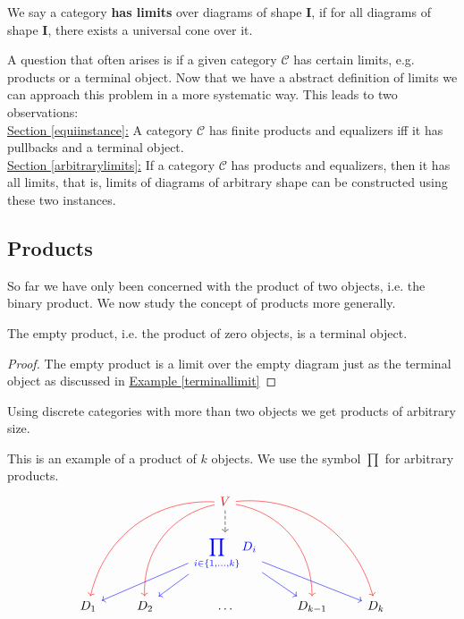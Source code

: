 \begin{definition}
We say a category \textbf{has limits} over diagrams of shape $\bm I$, if for all
diagrams of shape $\bm I$, there exists a universal cone over it.
\end{definition}
A question that often arises is if a given category $\mathscr C$ has certain limits,
e.g. products or a terminal object. Now that we have a abstract definition of limits
we can approach this problem in a more systematic way.
This leads to two observations:\\
\hyperref[equiinstance]{Section \ref*{equiinstance}:} A category $\mathscr C$ has finite products and equalizers iff
it has pullbacks and a terminal
object.\\
\hyperref[arbitrarylimits]{Section \ref*{arbitrarylimits}:}
If a category $\mathscr C$ has products and equalizers, then it has all limits, that is,
limits of diagrams of arbitrary shape can be constructed using these two instances.

\subsection{Products}
So far we have only been concerned with the product of two objects, i.e. the binary product.
We now study the concept of products more generally.
\begin{lemma}
  \label{emptyproduct}
  The empty product, i.e. the product of zero objects, is a terminal object.
\end{lemma}
\begin{proof}
  The empty product is a limit over the empty diagram just as the terminal object
  as discussed in
  \hyperref[terminallimit]{Example \ref*{terminallimit}}
\end{proof}

Using discrete categories with more than two objects
we get products of arbitrary size.
\begin{example}
  This is an example of a product of $k$ objects. We use the symbol $\prod$ for
  arbitrary products.
  \[
    \begin{tikzcd}
      && {\color{red} V}
      \arrow[bend right=40,color=red]{ddll}
      \arrow[bend right=40,color=red]{ddl}
      \arrow[bend left=40,color=red]{ddrr}
      \arrow[bend left=40,color=red]{ddr}
      \arrow[dashed]{d} &&\\
      && {\color{blue} {\displaystyle \prod_{i \in \{1,\ldots,k\} } D_i}}
      \arrow[color=blue]{dl}
      \arrow[color=blue]{dll}
      \arrow[color=blue]{dr}
      \arrow[color=blue]{drr} &&\\
      D_1 & D_2 & \ldots & D_{k-1} & D_k
    \end{tikzcd}
  \]
\end{example}

